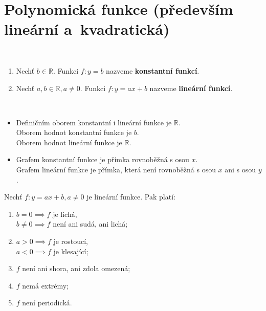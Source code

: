 \section{Polynomická funkce (především lineární a~kvadratická)}

\begin{definition}\,
\begin{enumerate}
  \item Nechť $b \in \mathbb R$. Funkci $f:y = b$ nazveme \textbf{konstantní funkcí}.
  \item Nechť $a, b \in \mathbb R, a \neq 0$. Funkci $f:y= ax + b$ nazveme \textbf{lineární funkcí}.
\end{enumerate}
\end{definition}

\begin{pozn}\,
  \begin{itemize}
    \item Definičním oborem konstantní i lineární funkce je $\mathbb R$. \\
          Oborem hodnot konstantní funkce je ${b}$.\\
          Oborem hodnot lineární funkce je $\mathbb R$.
    \item Grafem konstantní funkce je přímka rovnoběžná s osou $x$. \\
          Grafem lineární funkce je přímka, která není rovnoběžná s osou $x$ ani s osou $y$.
  \end{itemize}
\end{pozn}

\begin{veta}
  Nechť $f: y = ax + b, a \neq 0$ je lineární funkce. Pak platí:
  \begin{enumerate}[$i.$]
    \item $b=0 \implies f$ je lichá,\\
          $b \neq 0 \implies f$ není ani sudá, ani lichá;
    \item $a > 0 \implies f$ je rostoucí,\\
          $a < 0 \implies f$ je klesající;
    \item $f$ není ani shora, ani zdola omezená;
    \item $f$ nemá extrémy;
    \item $f$ není periodická.
  \end{enumerate}
\end{veta}

